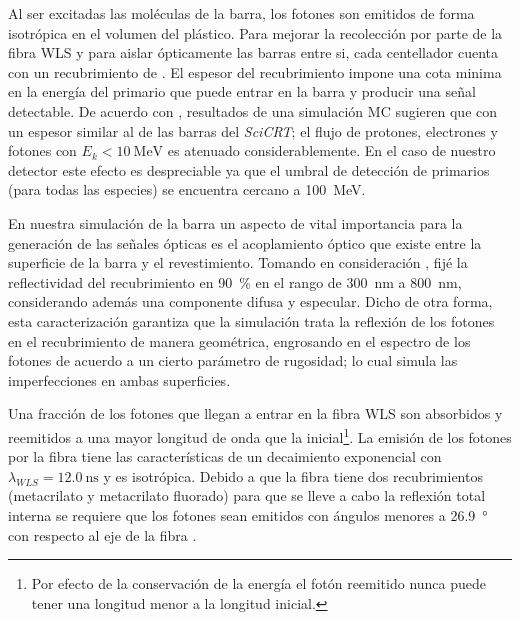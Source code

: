 Al ser excitadas las moléculas de la barra, los fotones son emitidos de forma isotrópica en el volumen del plástico. Para mejorar la recolección por parte de la fibra WLS y para aislar ópticamente las barras entre si, cada centellador cuenta con un recubrimiento de . El espesor del recubrimiento impone una cota minima en la energía del primario que puede entrar en la barra y producir una señal detectable. De acuerdo con \cite{gros18}, resultados de una simulación MC sugieren que con un espesor similar al de las barras del \emph{SciCRT}; el flujo de protones, electrones y fotones con $E_{k}<\SI{10}{\mega\electronvolt}$ es atenuado considerablemente. En el caso de nuestro detector este efecto es despreciable ya que el umbral de detección de primarios (para todas las especies) se encuentra cercano a \SI{100}{\mega\electronvolt}.

En nuestra simulación de la barra un aspecto de vital importancia para la generación de las señales ópticas es el acoplamiento óptico que existe entre la superficie de la barra y el revestimiento. Tomando en consideración \cite{dietz16,gros18}, fijé la reflectividad del recubrimiento en \SI{90}{\percent} en el rango de \SI{300}{\nano\metre} a \SI{800}{\nano\metre}, considerando además una componente difusa y especular. Dicho de otra forma, esta caracterización garantiza que la simulación trata la reflexión de los fotones en el recubrimiento de manera geométrica, engrosando en el espectro de los fotones de acuerdo a un cierto parámetro de rugosidad; lo cual simula las imperfecciones en ambas superficies.

Una fracción de los fotones que llegan a entrar en la fibra WLS son absorbidos y reemitidos a una mayor longitud de onda que la inicial\footnote{Por efecto de la conservación de la energía el fotón reemitido nunca puede tener una longitud menor a la longitud inicial.}. La emisión de los fotones por la fibra tiene las características de un decaimiento exponencial con $\lambda_{WLS}=\SI{12.0}{\nano\second}$ y es isotrópica. Debido a que la fibra tiene dos recubrimientos (metacrilato y metacrilato fluorado) para que se lleve a cabo la reflexión total interna se requiere que los fotones sean emitidos con ángulos menores a \SI{26.9}{\degree} con respecto al eje de la fibra \cite{kikawa14}.


